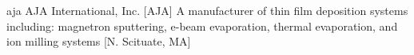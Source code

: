 \newglsXcompany%
{aja}%
{AJA International, Inc.}%
[AJA]%
{A manufacturer of thin film deposition systems including: magnetron sputtering, e-beam evaporation, thermal evaporation, and ion milling systems \cite{website:AJA_International}}%
[N. Scituate, MA]%
